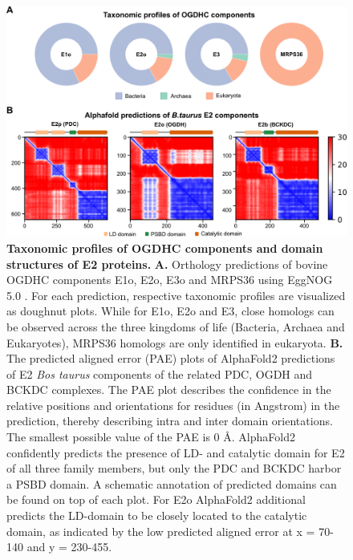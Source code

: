 \begin{subappendices}
\begin{figure}[hbt!]
        \label{fig:ch5_app_fig1}
    \end{figure}
    \begin{figure}[hbt]
        \center
        \includegraphics[]{Chapter.5/Figures/SI_Figure2.png}
        \caption{\textbf{Taxonomic profiles of OGDHC components and domain structures of E2 proteins.} \textbf{A.} Orthology predictions of bovine OGDHC components E1o, E2o, E3o and MRPS36 using EggNOG 5.0 \cite{Huerta-Cepas_2019}. For each prediction, respective taxonomic profiles are visualized as doughnut plots. While for E1o, E2o and E3, close homologs can be observed across the three kingdoms of life (Bacteria, Archaea and Eukaryotes), MRPS36 homologs are only identified in eukaryota. \textbf{B.} The predicted aligned error (PAE) plots of AlphaFold2 predictions of E2 \emph{Bos taurus} components of the related PDC, OGDH and BCKDC complexes. The PAE plot describes the confidence in the relative positions and orientations for residues (in Angstrom) in the prediction, thereby describing intra and inter domain orientations. The smallest possible value of the PAE is 0 Å. AlphaFold2 confidently predicts the presence of LD- and catalytic domain for E2 of all three family members, but only the PDC and BCKDC harbor a PSBD domain. A schematic annotation of predicted domains can be found on top of each plot. For E2o AlphaFold2 additional predicts the LD-domain to be closely located to the catalytic domain, as indicated by the low predicted aligned error at x = 70-140 and y = 230-455.}
        \label{fig:ch5_app_fig2}
    \end{figure}
    \begin{figure}[hbt]
        \center

\end{figure}
\end{subappendices}
